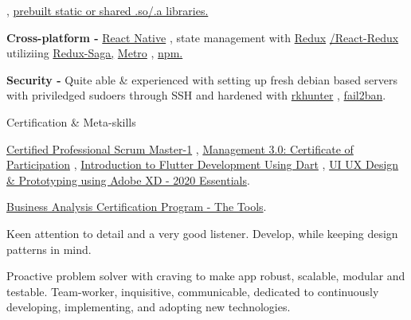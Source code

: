 \begin{skillsentries}
{\begin{skillsitems}
{        , 
        {\href{https://developer.android.com/ndk/guides/prebuilts}{prebuilt static or shared .so/.a libraries.}}}
        \item {\textbf{Cross-platform -} 
        {\href{https://facebook.github.io/react-native/}{React Native}}
        , state management with 
        {\href{https://redux.js.org}{Redux}}
        {\href{https://react-redux.js.org}{/React-Redux }}
        utiliziing 
        {\href{https://redux-saga.js.org}{Redux-Saga,}} 
        {\href{https://github.com/facebook/metro}{Metro}}
        ,
         {\href{https://www.npmjs.com}{npm.}}}
        \item {\textbf{Security - } Quite able \& experienced with setting up fresh debian based servers with priviledged sudoers through SSH and hardened with 
        {\href{http://rkhunter.sourceforge.net}{rkhunter}}
        ,
        {\href{https://www.fail2ban.org/wiki/index.php/Main_Page}{fail2ban}}.}
      \end{skillsitems}
    }

    
    \skillsentry
    {Certification \& Meta-skills} %
    {
      \begin{skillsitems} %
        \item {\href{https://www.scrum.org/badges/awards/524407}{Certified Professional Scrum Master-1}
        , \href{https://drive.google.com/file/d/1lvfgnIfRZTEfw-g1Aq8YUFGmGqIw1ywU/view?usp=sharing}{Management 3.0: Certificate of Participation}
        , \href{https://drive.google.com/file/d/1U15zqely5Y4aUvPV6STjewR5rzNdkghe/view?usp=sharing}{Introduction to Flutter Development Using Dart} 
        , \href{http://ude.my/UC-1eea6925-e5cc-4c74-aa8f-a8205c341d13}{UI UX Design \& Prototyping using Adobe XD - 2020 Essentials}.}
        \item {\href{http://ude.my/UC-dbf43b00-3bb0-4607-b137-79c1425a9109}{Business Analysis Certification Program - The Tools}.}
        \item {Keen attention to detail and a very good listener. Develop, while keeping design patterns in mind.}
        \item {Proactive problem solver with craving to make app robust, scalable, modular and testable. Team-worker, inquisitive, communicable, 
        dedicated to continuously developing, implementing, and adopting new technologies.}
      \end{skillsitems}
      }
      
\end{skillsentries}

